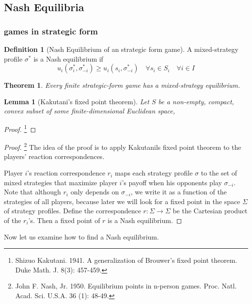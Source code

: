 \documentclass{article}
\newtheorem{Thm}{Theorem}[section]
\newtheorem{Lem}{Lemma}[section]
\theoremstyle{definition}
\newtheorem{Def}{Definition}[section]
\begin{document}
\subsection{Nash Equilibria}
\subsubsection{games in strategic form}
\begin{Def}[Nash Equilibrium of an strategic form game]
    A mixed-strategy profile $\sigma^*$ is a Nash equilibrium if 
    \[ u_i(\sigma_i^*,\sigma_{-i}^*)\ge u_i(s_i,\sigma_{-i}^*)\quad \forall s_i\in S_i\quad \forall i\in I\]
\end{Def}
\begin{Thm}
    Every finite strategic-form game has a mixed-strategy equilibrium.
\end{Thm}
\begin{Lem}[Kakutani's fixed point theorem]
    Let $S$ be a non-empty, compact, convex subset of some finite-dimensional Euclidean space,
\end{Lem}
\begin{proof}
    \footnote{Shizuo Kakutani. 1941. A generalization of Brouwer's fixed point theorem. Duke Math. J. 8(3): 457-459.}
\end{proof}
\begin{proof}
    \footnote{John F. Nash, Jr. 1950. Equilibrium points in n-person games. Proc. Natl. Acad. Sci. U.S.A. 36 (1): 48-49.}
    The idea of the proof is to apply Kakutanils fixed point theorem to the players' reaction correspondences.\par 
    Player $i$'s reaction correspondence $r_i$ maps each strategy profile $\sigma$ to the set of mixed strategies that maximize
    player $i$'s payoff when his opponents play $\sigma_{-i}$. Note that although $r_i$ only depends on $\sigma_{-i}$,
    we write it as a function of the strategies of all players, because later we will look for a fixed point in the space $\Sigma$ of strategy profiles.
    Define the correspondence $r:\Sigma\to\Sigma$ be the Cartesian product of the $r_i$'s. Then a fixed point of $r$ is a Nash equilibrium.
\end{proof}
Now let us examine how to find a Nash equilibrium.
\end{document}
